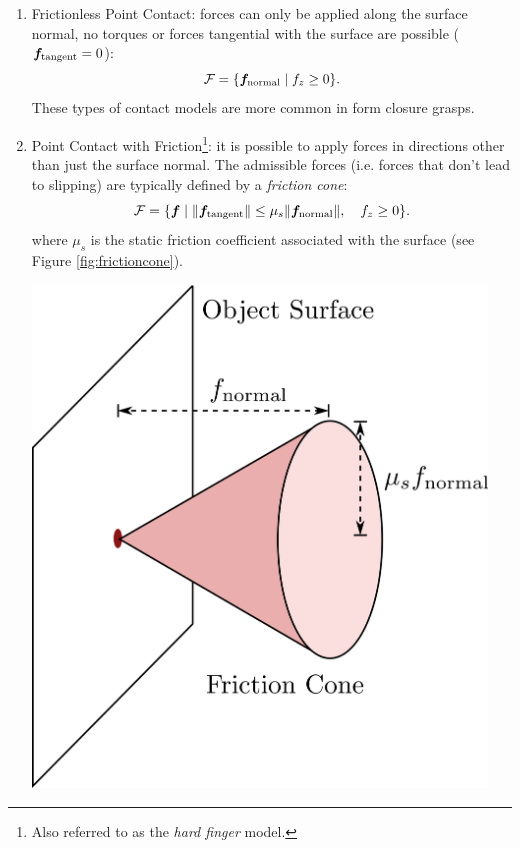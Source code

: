 \begin{enumerate}
    \item Frictionless Point Contact: forces can only be applied along the surface normal, no torques or forces tangential with the surface are possible ($\bm{f}_{\text{tangent}} = 0$):
    \begin{equation*}
        \mathcal{F} = \{\bm{f}_{\text{normal}} \mid f_z \geq 0\}.
    \end{equation*}
    These types of contact models are more common in form closure grasps.
    
    \item Point Contact with Friction\footnote[][-8\baselineskip]{Also referred to as the \textit{hard finger} model.}: it is possible to apply forces in directions other than just the surface normal. The admissible forces (i.e. forces that don't lead to slipping) are typically defined by a \textit{friction cone}:
    \begin{equation*}
        \mathcal{F} = \{\bm{f} \mid \lVert \bm{f}_{\text{tangent}} \rVert \leq \mu_s\lVert  \bm{f}_{\text{normal}}  \rVert, \quad f_z \geq 0\}.
    \end{equation*}
    where $\mu_s$ is the static friction coefficient associated with the surface (see Figure \ref{fig:frictioncone}).
    \begin{marginfigure}[-15\baselineskip] 
    \begin{center}
    \includegraphics[width=0.95\textwidth]{tex/figs/ch26_figs/frictioncone.png}

\end{center}
\end{marginfigure}
\end{enumerate}
